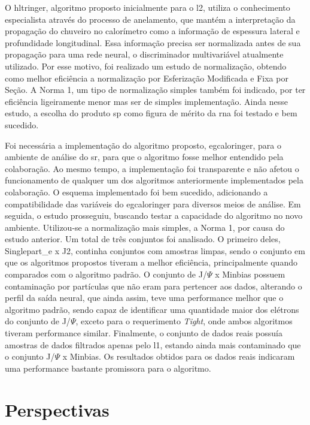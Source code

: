 O \gls{hltringer}, algoritmo proposto inicialmente para o \gls{l2}, utiliza o
conhecimento especialista através do processo de anelamento, que mantém a interpretação da propagação do
chuveiro no calorímetro como a informação de espessura lateral e profundidade
longitudinal. Essa informação precisa ser normalizada antes de sua propagação
para uma rede neural, o discriminador multivariável atualmente utilizado.
Por esse motivo, foi realizado um estudo de normalização, obtendo como 
melhor eficiência a normalização por Esferização Modificada e Fixa por Seção.
A Norma 1, um tipo de normalização simples também foi indicado, por ter
eficiência ligeiramente menor mas ser de simples implementação. Ainda nesse
estudo, a escolha do produto \gls{sp} como figura de mérito da \gls{rna} foi
testado e bem sucedido.

Foi necessária a implementação do algoritmo proposto, \gls{egcaloringer}, para o ambiente de análise
do \gls{sr}, para que o algoritmo fosse melhor
entendido pela colaboração. Ao mesmo tempo, a implementação foi transparente e não
afetou o funcionamento de qualquer um dos algoritmos anteriormente implementados
pela colaboração. O esquema implementado foi bem sucedido, adicionando a compatibilidade das variáveis
do \gls{egcaloringer} para diversos meios de análise. Em seguida, o estudo
prosseguiu, buscando testar a capacidade do algoritmo no novo ambiente.
Utilizou-se a normalização mais simples, a Norma 1, por causa do estudo anterior.
Um total de três conjuntos foi analisado. O primeiro deles, Singlepart\_e x J2,
continha conjuntos com amostras limpas, sendo o conjunto em que os algoritmos
propostos tiveram a melhor eficiência, principalmente quando comparados com o
algoritmo padrão. O conjunto de J/$\Psi$ x Minbias possuem contaminação por
partículas que não eram para pertencer aos dados, alterando o perfil da saída
neural, que ainda assim, teve uma performance melhor que o algoritmo padrão, sendo
capaz de identificar uma quantidade maior dos elétrons do conjunto de J/$\Psi$,
exceto para o requerimento \emph{Tight}, onde ambos algoritmos tiveram
performance similar. Finalmente, o conjunto de dados reais possuía amostras de
dados filtrados apenas pelo \gls{l1}, estando ainda mais contaminado que o
conjunto J/$\Psi$ x Minbias. Os resultados obtidos para os dados reais indicaram
uma performance bastante promissora para o algoritmo. 

  
\section{Perspectivas}


